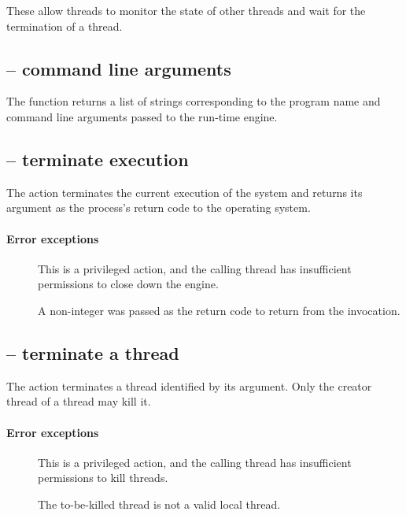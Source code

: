 These allow threads to monitor the state of other threads and wait for the termination of a thread.

\subsection{ -- command line arguments}
\label{misc:commandline}


The  function returns a list of strings corresponding to the program name and command line arguments passed to the \go run-time engine.


\subsection{ -- terminate \go execution}
\label{misc:exit}


The  action terminates the current execution of the \go system and returns its argument as the process's return code to the operating system.


\paragraph{Error exceptions}
\begin{description}
\item[]
This is a privileged action, and the calling thread has insufficient permissions to close down the \go engine.
\item[]
A non-integer was passed as the return code to return from the \go invocation.
\end{description}

\subsection{ -- terminate a \go thread}
\label{misc:kill}


The  action terminates a thread identified by its argument.  Only the creator thread of a thread may kill it.

\paragraph{Error exceptions}
\begin{description}
\item[]
This is a privileged action, and the calling thread has insufficient permissions to kill threads.
\item[]
The to-be-killed thread is not a valid local thread.
\end{description}

